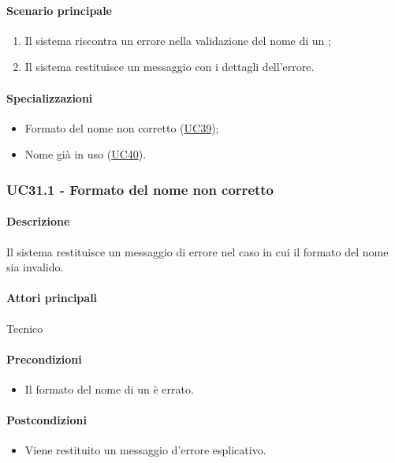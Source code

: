 \paragraph*{Scenario principale}
\begin{enumerate}
  \item Il sistema riscontra un errore nella validazione del nome di un ;
  \item Il sistema restituisce un messaggio con i dettagli dell'errore.  
\end{enumerate}

\paragraph*{Specializzazioni}
\begin{itemize}
  \item Formato del nome non corretto (\hyperref[UC39]{UC39});
  \item Nome già in uso (\hyperref[UC40]{UC40}).
\end{itemize}


\subsubsection{UC31.1 - Formato del nome non corretto}\label{UC31point1}
\paragraph*{Descrizione}
Il sistema restituisce un messaggio di errore nel caso in cui il formato del nome sia invalido.

\paragraph*{Attori principali}
Tecnico

\paragraph*{Precondizioni}
\begin{itemize}
  \item Il formato del nome di un  è errato.
\end{itemize}

\paragraph*{Postcondizioni}
\begin{itemize}
  \item Viene restituito un messaggio d'errore esplicativo.
\end{itemize}

